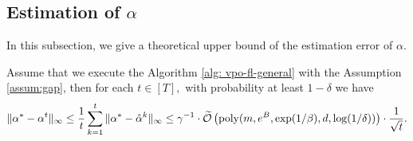 \subsection{Estimation of $\alpha$}
In this subsection, we give a theoretical upper bound of the estimation error of $\alpha$. 
\begin{theorem}\label{thm:est of alpha}
    Assume that we execute the Algorithm \ref{alg: vpo-fl-general} with the Assumption \ref{assum:gap}, then for each $t \in [T],$ with probability at least $1-\delta$ we have 
    \begin{align}
        \|\alpha^* - \alpha^t\|_\infty \le \frac{1}{t}\sum_{k=1}^{t}\|\alpha^* - \hat{\alpha}^k\|_\infty\le \gamma^{-1}\cdot \widetilde{\mathcal{O}}\left(\mathrm{poly}(m,e^B, \exp(1/\beta), d,\log(1/\delta))\right)\cdot \frac{1}{\sqrt{t}}.\label{eq:estimate alpha final result}
    \end{align}
\end{theorem}
